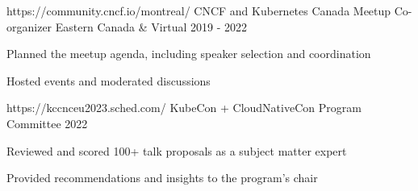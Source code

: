 
\begin{cventries}

  \cventry
    {https://community.cncf.io/montreal/} %
    {CNCF and Kubernetes Canada Meetup Co-organizer} %
    {Eastern Canada \& Virtual} %
    {2019 - 2022} %
    {
      \begin{cvitems} %
        \item {Planned the meetup agenda, including speaker selection and coordination}
        \item {Hosted events and moderated discussions}
      \end{cvitems}
    }

  \cventry
    {https://kccnceu2023.sched.com/} %
    {KubeCon + CloudNativeCon Program Committee} %
    {} %
    {2022} %
    {
      \begin{cvitems} %
        \item {Reviewed and scored 100+ talk proposals as a subject matter expert}
        \item {Provided recommendations and insights to the program's chair}
      \end{cvitems}
    }

\end{cventries}